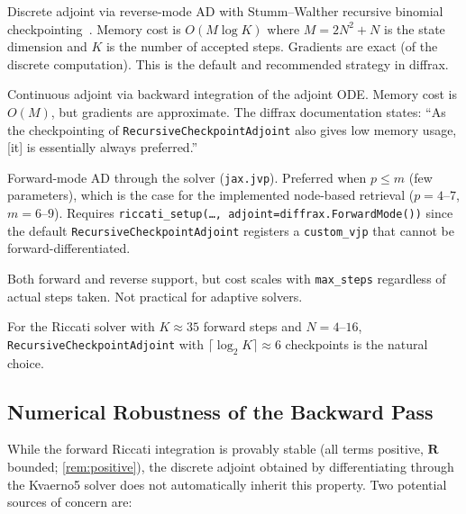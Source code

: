 \documentclass[11pt,a4paper]{article}
\newcommand{\mat}[1]{\mathbf{#1}}
\theoremstyle{definition}
\begin{document}
\begin{description}[style=nextline, leftmargin=2em]
  \item[\texttt{RecursiveCheckpointAdjoint}~(recommended)]
    Discrete adjoint via reverse-mode AD with Stumm--Walther recursive
    binomial checkpointing~\cite{griewank2008}.  Memory cost is
    $O(M \log K)$ where $M = 2N^2 + N$ is the state dimension and
    $K$ is the number of accepted steps.  Gradients are exact (of the
    discrete computation).  This is the default and recommended strategy
    in diffrax.

  \item[\texttt{BacksolveAdjoint}~(not recommended)]
    Continuous adjoint via backward integration of the adjoint ODE.
    Memory cost is $O(M)$, but gradients are approximate.  The diffrax
    documentation states: ``As the checkpointing of
    \texttt{RecursiveCheckpointAdjoint} also gives low memory usage,
    [it] is essentially always preferred.''

  \item[\texttt{ForwardMode}~(used for the retrieval)]
    Forward-mode AD through the solver (\texttt{jax.jvp}).  Preferred
    when $p \leq m$ (few parameters), which is the case for the
    implemented node-based retrieval ($p = 4$--$7$, $m = 6$--$9$).
    Requires \texttt{riccati\_setup(\ldots, adjoint=diffrax.ForwardMode())}
    since the default \texttt{RecursiveCheckpointAdjoint} registers a
    \texttt{custom\_vjp} that cannot be forward-differentiated.

  \item[\texttt{DirectAdjoint}]
    Both forward and reverse support, but cost scales with
    \texttt{max\_steps} regardless of actual steps taken.  Not practical
    for adaptive solvers.
\end{description}

For the Riccati solver with $K \approx 35$ forward steps and
$N = 4$--$16$, \texttt{RecursiveCheckpointAdjoint} with
$\lceil\log_2 K\rceil \approx 6$ checkpoints is the natural choice.

\subsection{Numerical Robustness of the Backward Pass}
\label{sec:adjoint-robustness}

While the forward Riccati integration is provably stable (all terms
positive, $\mat{R}$ bounded; \cref{rem:positive}), the discrete adjoint
obtained by differentiating through the Kvaerno5 solver does not
automatically inherit this property.  Two potential sources of concern
are:
\end{document}
